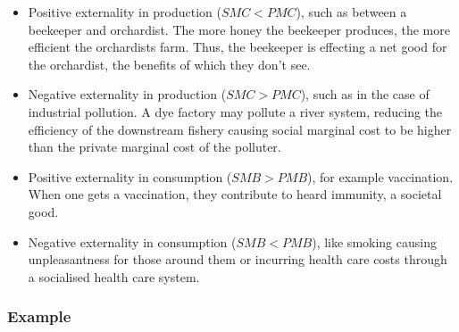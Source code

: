 \documentclass[12pt]{report}
\begin{document}
\begin{itemize}
    \item Positive externality in production (\(SMC < PMC\)), such as between
    a beekeeper and orchardist. The more honey the beekeeper produces, the
    more efficient the orchardists farm. Thus, the beekeeper is effecting a
    net good for the orchardist, the benefits of which they don't see.
    \item Negative externality in production (\(SMC > PMC\)), such as in the
    case of industrial pollution. A dye factory may pollute a river system,
    reducing the efficiency of the downstream fishery causing social marginal
    cost to be higher than the private marginal cost of the polluter.
    \item Positive externality in consumption (\(SMB > PMB\)), for example
    vaccination. When one gets a vaccination, they contribute to heard 
    immunity, a societal good.
    \item Negative externality in consumption (\(SMB < PMB\)), like smoking
    causing unpleasantness for those around them or incurring health care 
    costs through a socialised health care system.
\end{itemize}

\subsubsection*{Example}
\end{document}
